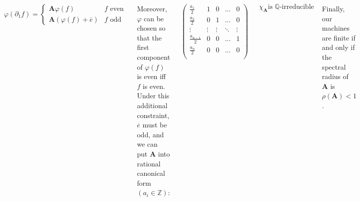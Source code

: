 \documentclass[24pt]{tikzposter}
\theoremstyle{definition}
\newcommand{\Z}{\mathbb{Z}}
\newcommand{\Q}{\mathbb{Q}}
\newcommand{\del}{\partial}
\begin{document}
\begin{columns}
{    \bigskip

    \[ 
      \varphi(\del_1 f) = 
      \begin{cases} 
        \mathbf{A} \varphi(f) & \text{$f$ even} \\
        \mathbf{A} (\varphi(f) + \overline{e}) & \text{$f$ odd}
      \end{cases}
    \]

    \bigskip
    \bigskip

    Moreover, $\varphi$ can be chosen so that the first component of 
    $\varphi(f)$ is even iff $f$ is even. Under this additional constraint,
    $\overline{e}$ must be odd, and we can put $\mathbf{A}$ into 
    rational canonical form $(a_{i} \in \Z)$:

    \[
      \begin{pmatrix}
        \frac{a_1}{2}     & 1      & 0      & \dots  & 0\\
        \frac{a_2}{2}     & 0      & 1      & \dots  & 0\\ 
        \vdots            & \vdots & \vdots & \ddots & \vdots\\
        \frac{a_{n-1}}{2} & 0      & 0      & \dots  & 1\\
        \frac{a_n}{2}     & 0      & 0      & \dots  & 0\\
      \end{pmatrix}
    \]

    \[ \chi_\mathbf{A} \text{is $\Q$-irreducible} \]

    Finally, our machines are finite if and only if the spectral radius of
    $\mathbf{A}$ is $\rho(\mathbf{A}) < 1$.
  }



  {
    By choosing a 1/2-integral matrix $\mathbf{A}$ and an odd residuation
    vector $\overline{e}$, we can view $\Z^m$ as a Mealy Automaton with
    countably many states $\mathfrak{C}(\mathbf{A},\overline{e})$. 
    It is then natural to ask the following questions:

    \bigskip

    \begin{itemize}
      \item For which choices of $\mathbf{A}$, $\overline{e}$ can we find
        a machine $\mathcal{A}$ as a subautomaton of 
        $\mathfrak{C}(\mathbf{A}, \overline{e})$?

      \item For which $\overline{e}$ is 
        $\mathcal{G}(\mathcal{A}) \cong \mathfrak{C}(\mathbf{A},\overline{e})$
        as an automaton?


\end{itemize}}
\end{columns}
\end{document}
